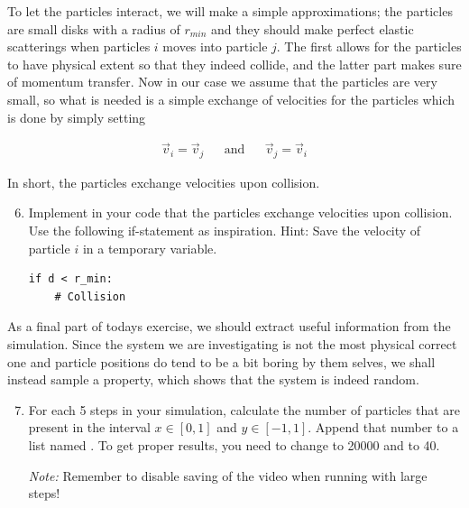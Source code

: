 \documentclass{article}
\begin{document}
To let the particles interact, we will make a simple approximations; the
particles are small disks with a radius of $r_{min}$ and they should make
perfect elastic scatterings when particles $i$ moves into particle $j$.  The
first allows for the particles to have physical extent so that they indeed
collide, and the latter part makes sure of momentum transfer.  Now in our case
we assume that the particles are very small, so what is needed is a simple
exchange of velocities for the particles which is done by simply setting

\begin{align}
  \vec{v}_i = \vec{v}_j & & \text{and} & & \vec{v}_j = \vec{v}_i
\end{align}

In short, the particles exchange velocities upon collision.

\begin{enumerate}
  \setcounter{enumi}{5}
  \item Implement in your code that the particles exchange velocities upon
    collision. Use the following if-statement as inspiration.
    {Hint:} Save the velocity of particle $i$ in a temporary variable.

\begin{lstlisting}
if d < r_min:
    # Collision
\end{lstlisting}

\end{enumerate}

As a final part of todays exercise, we should extract useful information from
the simulation.
Since the system we are investigating is not the most physical correct one and
particle positions do tend to be a bit boring by them selves, we shall instead
sample a property, which shows that the system is indeed random.

\begin{enumerate}
  \setcounter{enumi}{6}
  \item For each 5 steps in your simulation, calculate the number of particles
    that are present in the interval $x \in [0, 1]$ and $y \in [-1, 1]$.
    Append that number to a list named .  To get proper results,
    you need to change  to 20000 and  to 40.

    {\em Note:} Remember to disable saving of the video when running with large
    steps!

\end{enumerate}
\end{document}

